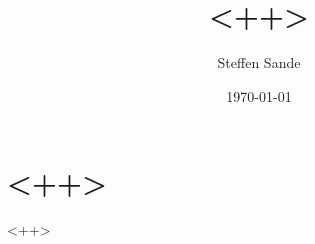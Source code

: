 \documentclass{article}
\author{Steffen Sande}
\title{<++>}
\date{\today}
\begin{document}
\maketitle
\clearpage
\section{<++>}

<++>
\end{document}
